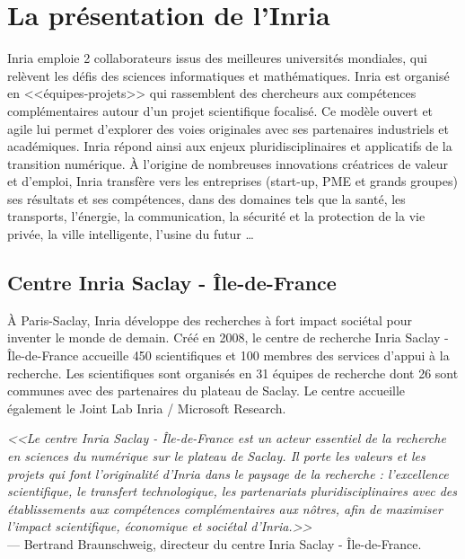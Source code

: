 \documentclass[a4paper, titlepage, 11pt]{article}
\theoremstyle{definition}
\theoremstyle{remark}
\begin{document}
\setcounter{tocdepth}{1}
\tableofcontents
\newpage

\section{La présentation de l'Inria}\label{sec:presInria}

Inria emploie 2 collaborateurs issus des meilleures universités mondiales, qui relèvent les défis des sciences informatiques et mathématiques. Inria est organisé en <<équipes-projets>> qui rassemblent des chercheurs aux compétences complémentaires autour d’un projet scientifique focalisé. Ce modèle ouvert et agile lui permet d’explorer des voies originales avec ses partenaires industriels et académiques. Inria répond ainsi aux enjeux pluridisciplinaires et applicatifs de la transition numérique. À l'origine de nombreuses innovations créatrices de valeur et d'emploi, Inria transfère vers les entreprises (start-up, PME et grands groupes) ses résultats et ses compétences, dans des domaines tels que la santé, les transports, l'énergie, la communication, la sécurité et la protection de la vie privée, la ville intelligente, l’usine du futur …

\subsection{Centre Inria Saclay - Île-de-France}

À Paris-Saclay, Inria développe des recherches à fort impact sociétal pour inventer le monde de demain. Créé en 2008, le centre de recherche Inria Saclay - Île-de-France accueille 450 scientifiques et 100 membres des services d’appui à la recherche. Les scientifiques sont organisés en 31 équipes de recherche dont 26 sont communes avec des partenaires du plateau de Saclay. Le centre accueille également le Joint Lab Inria / Microsoft Research.

\textit{<<Le centre Inria Saclay - Île-de-France est un acteur essentiel de la recherche en sciences du numérique sur le plateau de Saclay. Il porte les valeurs et les projets qui font l’originalité d’Inria dans le paysage de la recherche : l’excellence scientifique, le transfert technologique, les partenariats pluridisciplinaires avec des établissements aux compétences complémentaires aux nôtres, afin de maximiser l’impact scientifique, économique et sociétal d’Inria.>>} \\
--- Bertrand Braunschweig, directeur du centre Inria Saclay - Île-de-France.
\end{document}
